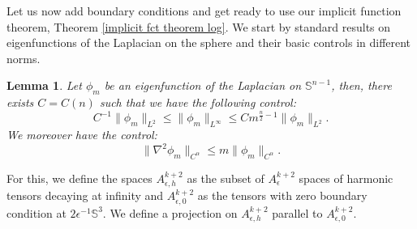 \documentclass[12pt]{article}
\newtheorem{lem}[thm]{Lemma}
\begin{document}
    Let us now add boundary conditions and get ready to use our implicit function theorem, Theorem \ref{implicit fct theorem log}. We start by standard results on eigenfunctions of the Laplacian on the sphere and their basic controls in different norms.
    
    \begin{lem}
        Let $\phi_m$ be an eigenfunction of the Laplacian on $\mathbb{S}^{n-1}$, then, there exists $C = C(n)$ such that we have the following control:
        $$C^{-1}\|\phi_m\|_{L^2}\leqslant\|\phi_m\|_{L^\infty}\leqslant C m^{\frac{n}{2}-1}\|\phi_m\|_{L^2}.$$
        We moreover have the control:
        $$\|\nabla^2\phi_m\|_{C^\alpha}\leqslant m \|\phi_m\|_{C^\alpha}.$$
    \end{lem}
    
    For this, we define the spaces $A_{\epsilon,h}^{k+2}$ as the subset of $A_\epsilon^{k+2}$ spaces of harmonic tensors decaying at infinity and $A_{\epsilon,0}^{k+2}$ as the tensors with zero boundary condition at $2\epsilon^{-1}\mathbb{S}^3$. We define a projection on $A_{\epsilon,h}^{k+2}$ parallel to $A_{\epsilon,0}^{k+2}$.
    
\end{document}
